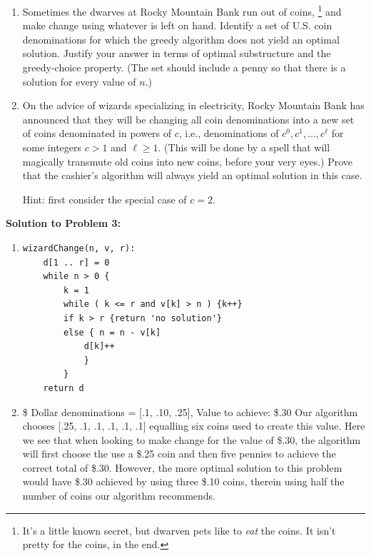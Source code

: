 \documentclass[12pt]{article}
\begin{document}
\begin{enumerate}
\begin{enumerate}
	\item Sometimes the dwarves at Rocky Mountain Bank run out of coins,%
	\footnote{It's a little known secret, but dwarven pets like to \textit{eat} the coins. It isn't pretty for the coins, in the end.}
	and make change using whatever is left on hand. Identify a set of U.S. coin denominations for which the greedy algorithm does not yield an optimal solution. Justify your answer in terms of optimal substructure and the greedy-choice property. (The set should include a penny so that there is a solution for every value of $n$.)


	
	\item On the advice of wizards specializing in electricity, Rocky Mountain Bank has announced that they will be changing all  coin denominations into a new set of coins denominated in powers of $c$, i.e., denominations of $c^{0}, c^{1}, \dots , c^{\ell}$ for some integers $c>1$ and $\ell\geq 1$.  (This will be done by a spell that will magically transmute old coins into new coins, before your very eyes.) Prove that the cashier's algorithm will always yield an optimal solution in this case.
	
	Hint: first consider the special case of $c=2$.

	\end{enumerate}
 
\pagebreak
\textbf{Solution to Problem 3:}
\begin{enumerate}
\item
\begin{verbatim}
wizardChange(n, v, r):
    d[1 .. r] = 0
    while n > 0 {
        k = 1
        while ( k <= r and v[k] > n ) {k++}
        if k > r {return 'no solution'}
        else { n = n - v[k]
            d[k]++
            }
        }
    return d
\end{verbatim}

\item
\$ Dollar denominations = [.1, .10, .25], Value to achieve: \$.30 \newline
Our algorithm chooses [.25, .1, .1, .1, .1, .1] equalling six coins used to create this value. Here we see that when looking to make change for the value of \$.30, the algorithm will first choose the use a \$.25 coin and then five pennies to achieve the correct total of \$.30. However, the more optimal solution to this problem would have \$.30 achieved by using three \$.10 coins, therein using half the number of coins our algorithm recommends. 


\end{enumerate}
\end{enumerate}
\end{document}
